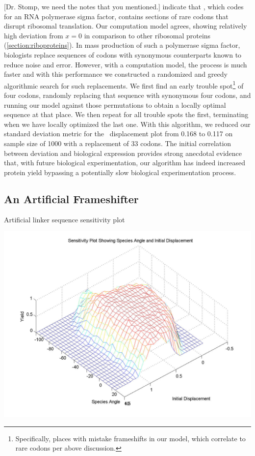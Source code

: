\documentclass[12pt, draft]{article}
\numberwithin{equation}{section}
\begin{document}
[Dr. Stomp, we need the notes that you mentioned.]
\citet{rpoS:process} indicate that \rpoS, which codes for an RNA
polymerase sigma factor, contains sections of rare codons that disrupt
ribosomal translation. Our computation model agrees, showing
relatively high deviation from $x = 0$ in comparison to other
ribosomal proteins (\autoref{section:riboproteins}). In mass
production of such a polymerase sigma factor, biologists replace
sequences of codons with synonymous counterparts known to reduce noise
and error. However, with a computation model, the process is much
faster and with this performance we constructed a randomized and greedy
algorithmic search for such replacements. We first find an
early trouble spot\footnote{Specifically, places with mistake
  frameshifts in our model, which correlate to rare codons per above
  discussion.} of four codons, randomly replacing that sequence with
synonymous four codons, and running our model against those
permutations to obtain a locally optimal sequence at that place. We
then repeat for all trouble spots the first, terminating when we have
locally optimized the last one. With this algorithm, we reduced our
standard deviation metric for the \rpoS\ displacement plot from 0.168
to 0.117 on sample size of 1000 with a replacement of 33 codons. The
initial correlation between deviation and biological expression
provides strong anecdotal evidence that, with future biological
experimentation, our algorithm has indeed increased protein yield
bypassing a potentially slow biological experimentation process.

\subsection{An Artificial Frameshifter}
\begin{cfigure}
  \caption{Artificial linker sequence sensitivity plot}
  \label{linker:sens}
  \includegraphics[scale=0.25]{linker/sensitivity}
\end{cfigure}
\end{document}
